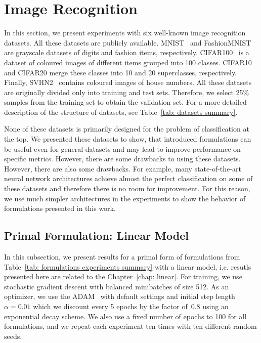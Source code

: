 \section{Image Recognition}

In this section, we present experiments with six well-known image recognition datasets. All these datasets are publicly available. MNIST~\cite{deng2012mnist} and FashionMNIST~\cite{xiao2017fashionmnist} are grayscale datasets of digits and fashion items, respectively. CIFAR100~\cite{krizhevsky2009learning} is a dataset of coloured images of different items grouped into 100 classes. CIFAR10 and CIFAR20 merge these classes into 10 and 20 superclasses, respectively. Finally, SVHN2~\cite{netzer2011reading} contains coloured images of house numbers. All these datasets are originally divided only into training and test sets. Therefore, we select 25\% samples from the training set to obtain the validation set. For a more detailed description of the structure of datasets, see Table~\ref{tab: datasets summary}.

None of these datasets is primarily designed for the problem of classification at the top. We presented these datasets to show, that introduced formulations can be useful even for general datasets and may lead to improve performance on specific metrics. However, there are some drawbacks to using these datasets. However, there are also some drawbacks. For example, many state-of-the-art neural network architectures achieve almost the perfect classification on some of these datasets and therefore there is no room for improvement. For this reason, we use much simpler architectures in the experiments to show the behavior of formulations presented in this work. 


\subsection{Primal Formulation: Linear Model}\label{sec: results primal linear}

In this subsection, we present results for a primal form of formulations from Table~\ref{tab: formulations experiments summary} with a linear model, i.e. resutls presented here are related to the Chapter~\ref{chap: linear}. For training, we use stochastic gradient descent with balanced minibatches of size 512. As an optimizer, we use the ADAM~\cite{kingma2014adam} with default settings and initial step length~$\alpha = 0.01$ which we discount every 5 epochs by the factor of~$0.8$ using an exponential decay scheme. We also use a fixed number of epochs to 100 for all formulations, and we repeat each experiment ten times with ten different random seeds.


